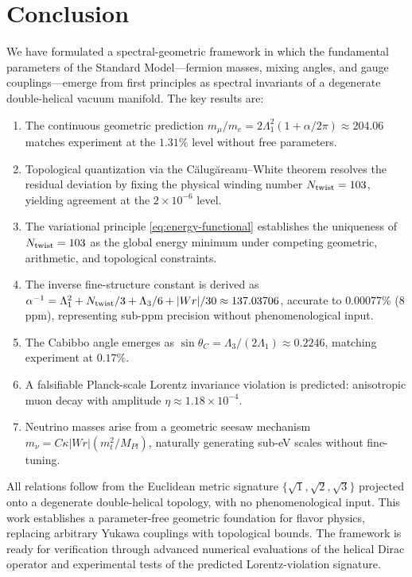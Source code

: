 \documentclass[12pt, a4paper]{article}
\theoremstyle{definition}
\newcommand{\Tw}{N_{\rm twist}}
\begin{document}
\section{Conclusion}
\label{sec:conclusion}

We have formulated a spectral-geometric framework in which the fundamental parameters of the Standard Model---fermion masses, mixing angles, and gauge couplings---emerge from first principles as spectral invariants of a degenerate double-helical vacuum manifold. The key results are:

\begin{enumerate}
    \item The continuous geometric prediction $m_\mu/m_e = 2\Lambda_1^2(1+\alpha/2\pi) \approx 204.06$ matches experiment at the $1.31\%$ level without free parameters.
    \item Topological quantization via the C\u{a}lug\u{a}reanu--White theorem resolves the residual deviation by fixing the physical winding number $\Tw = 103$, yielding agreement at the $2\times 10^{-6}$ level.
    \item The variational principle \eqref{eq:energy-functional} establishes the uniqueness of $\Tw = 103$ as the global energy minimum under competing geometric, arithmetic, and topological constraints.
    \item The inverse fine-structure constant is derived as $\alpha^{-1} = \Lambda_1^2 + \Tw/3 + \Lambda_3/6 + |Wr|/30 \approx 137.03706$, accurate to $0.00077\%$ (8 ppm), representing sub-ppm precision without phenomenological input.
    \item The Cabibbo angle emerges as $\sin\theta_C = \Lambda_3/(2\Lambda_1) \approx 0.2246$, matching experiment at $0.17\%$.
    \item A falsifiable Planck-scale Lorentz invariance violation is predicted: anisotropic muon decay with amplitude $\eta \approx 1.18 \times 10^{-4}$.
    \item Neutrino masses arise from a geometric seesaw mechanism $m_\nu = C \kappa |Wr| (m_t^2/M_{Pl})$, naturally generating sub-eV scales without fine-tuning.
\end{enumerate}

All relations follow from the Euclidean metric signature $\{\sqrt{1},\sqrt{2},\sqrt{3}\}$ projected onto a degenerate double-helical topology, with no phenomenological input. This work establishes a parameter-free geometric foundation for flavor physics, replacing arbitrary Yukawa couplings with topological bounds. The framework is ready for verification through advanced numerical evaluations of the helical Dirac operator and experimental tests of the predicted Lorentz-violation signature.
\end{document}
